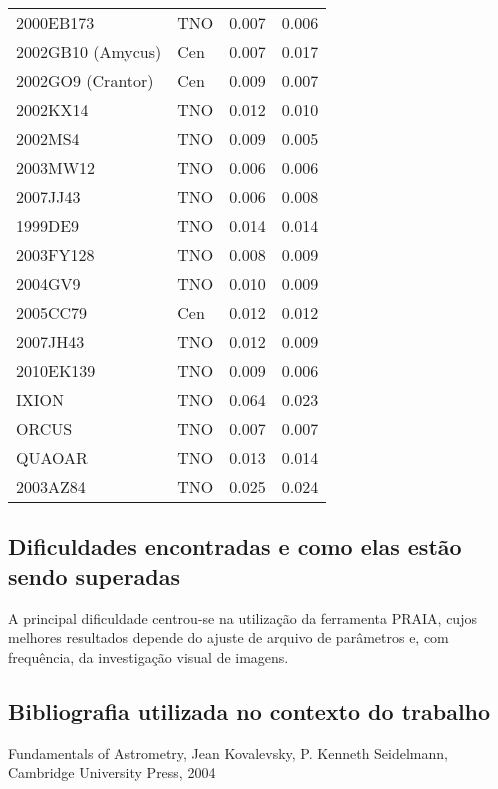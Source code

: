 \documentclass[a4paper, 11pt]{article}
\begin{document}
\begin{table}
\begin{center}
{\begin{tabular}{|l|l|c|c|}
2000EB173   &  TNO &  0.007 & 0.006 \\ 
2002GB10 (Amycus)  &  Cen &  0.007 & 0.017 \\ 
2002GO9 (Crantor)    &  Cen &  0.009 & 0.007 \\ 
2002KX14    &  TNO &  0.012 & 0.010 \\ 
2002MS4     &  TNO &  0.009 & 0.005 \\ 
2003MW12    &  TNO &  0.006 & 0.006 \\ 
2007JJ43    &  TNO &  0.006 & 0.008 \\ 
1999DE9     &  TNO &  0.014 & 0.014 \\ 
2003FY128   &  TNO &  0.008 & 0.009 \\ 
2004GV9     &  TNO &  0.010 & 0.009 \\ 
2005CC79    &  Cen &  0.012 & 0.012 \\ 
2007JH43    &  TNO &  0.012 & 0.009 \\ 
2010EK139   &  TNO &  0.009 & 0.006 \\ 
IXION       &  TNO &  0.064 & 0.023 \\ 
ORCUS       &  TNO &  0.007 & 0.007 \\ 
QUAOAR      &  TNO &  0.013 & 0.014 \\ 
2003AZ84    &  TNO &  0.025 & 0.024 \\ 
\hline
\end{tabular}}
\label{table:incerteza}
\end{center}
\end{table}

\subsection{Dificuldades encontradas e como elas estão sendo superadas}

A principal dificuldade centrou-se na utilização da ferramenta PRAIA, cujos
melhores resultados depende do ajuste de arquivo de parâmetros e, com frequência, da investigação visual de imagens.


\subsection{Bibliografia utilizada no contexto do trabalho}
\noindent Fundamentals of Astrometry, Jean Kovalevsky, P. Kenneth Seidelmann, Cambridge University Press, 2004
\end{document}

